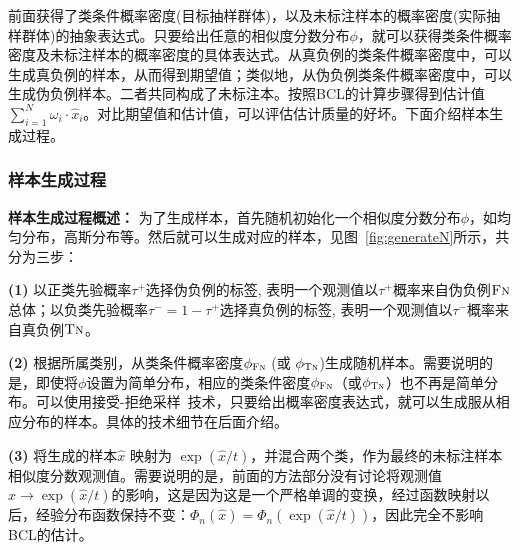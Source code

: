 前面获得了类条件概率密度(目标抽样群体)，以及未标注样本的概率密度(实际抽样群体)的抽象表达式。只要给出任意的相似度分数分布$\phi$，就可以获得类条件概率密度及未标注样本的概率密度的具体表达式。从真负例的类条件概率密度中，可以生成真负例的样本，从而得到期望值；类似地，从伪负例类条件概率密度中，可以生成伪负例样本。二者共同构成了未标注本。按照BCL的计算步骤得到估计值$\sum_{i=1}^N \omega_i \cdot \hat{x}_i$。对比期望值和估计值，可以评估估计质量的好坏。下面介绍样本生成过程。

\subsubsection{样本生成过程}
\textbf{样本生成过程概述：}
为了生成样本，首先随机初始化一个相似度分数分布$\phi$，如均匀分布，高斯分布等。然后就可以生成对应的样本，见图~\ref{fig:generateN}所示，共分为三步：
\par
\textbf{(1)} 以正类先验概率$\tau^+$选择伪负例的标签, 表明一个观测值以$\tau^+$概率来自伪负例$\textsc{Fn}$总体；以负类先验概率$\tau^-=1-\tau^+$选择真负例的标签, 表明一个观测值以$\tau^-$概率来自真负例$\textsc{Tn}$。

\par
\textbf{(2)} 根据所属类别，从类条件概率密度$\phi_{\textsc{Fn}}$ (或 $\phi_{\textsc{Tn}}$)生成随机样本。需要说明的是，即使将$\phi$设置为简单分布，相应的类条件密度$\phi_{\textsc{Fn}}$（或$\phi_{\textsc{Tn}}$）也不再是简单分布。可以使用接受-拒绝采样~\cite{casella2004generalized}技术，只要给出概率密度表达式，就可以生成服从相应分布的样本。具体的技术细节在后面介绍。
\par
\textbf{(3)} 将生成的样本$\hat{x}$ 映射为 $\exp(\hat{x}/t)$，并混合两个类，作为最终的未标注样本相似度分数观测值。需要说明的是，前面的方法部分没有讨论将观测值$\hat{x}\rightarrow \exp(\hat{x}/t)$的影响，这是因为这是一个严格单调的变换，经过函数映射以后，经验分布函数保持不变：$\Phi_n(\hat{x}) = \Phi_n(\exp(\hat{x}/t))$，因此完全不影响BCL的估计。

